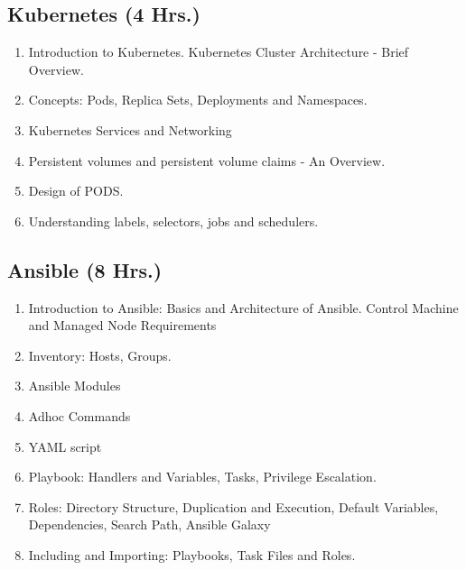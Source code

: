 \subsection{Kubernetes \hfill (4 Hrs.)} 
\begin{enumerate}
    \item Introduction to Kubernetes. Kubernetes Cluster Architecture - Brief Overview.
    \item Concepts: Pods, Replica Sets, Deployments and Namespaces.
    \item Kubernetes Services and Networking
    \item Persistent volumes and persistent volume claims - An Overview.
    \item Design of PODS.
    \item Understanding labels, selectors, jobs and schedulers.
\end{enumerate}

\subsection{Ansible \hfill (8 Hrs.)}
\begin{enumerate}
    \item Introduction to Ansible: Basics and Architecture of Ansible. Control Machine  and Managed Node Requirements
    \item Inventory: Hosts, Groups.
    \item Ansible Modules
    \item Adhoc Commands
    \item YAML script
    \item Playbook: Handlers and Variables, Tasks, Privilege Escalation.
    \item Roles: Directory Structure, Duplication and Execution, Default Variables, Dependencies, Search Path, Ansible Galaxy
    \item Including and Importing: Playbooks, Task Files and Roles.
\end{enumerate}